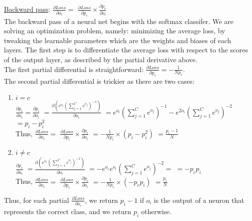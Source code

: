 \underline{Backward pass}: $\frac{\partial Loss}{\partial o_i} = $
$\frac{\partial Loss}{\partial p_c} \times \frac{\partial p_c}{\partial o_i}$\\
The backward pass of a neural net begins with the softmax classifer.
We are solving an optimization problem, namely: minimizing the average loss,
by tweaking the learnable parameters which are the weights and biases of each layers.
The first step is to differentiate the average loss with respect to the scores of the output layer,
as described by the partial derivative above.\\
The first partial differential is straightforward: $\frac{\partial Loss}{\partial p_c} = -\frac{1}{Np_c}$.\\
The second partial differential is trickier as there are two cases:
\begin{enumerate}[topsep=-12pt]
  
 \item $i = c$\\
   $ \frac{\partial p_c}{\partial o_i} = \frac{\partial p_i}{\partial o_i} $
   $ = \frac{\partial( e^{o_i} (\sum_{j=1}^{C} e^{o_j})^{-1})} {\partial o_i} $
   $ = e^{o_i} (\sum_{j=1}^{C} e^{o_j})^{-1} - e^{2o_i} (\sum_{j=1}^{C} e^{o_j})^{-2} $
   $ = p_i - p_i^2$\\
   Thus, $\frac{\partial Loss}{\partial o_i} = $
   $ \frac{\partial Loss}{\partial p_i} \times \frac{\partial p_i}{\partial o_i} $
   $ =  -\frac{1}{Np_i} \times (p_i - p_i^2) $
   $ = \frac{p_i - 1}{N} $
   
 \item $i \neq c$\\
   $ \frac{\partial p_c}{\partial o_i} $
   $ = \frac{\partial( e^{o_c} (\sum_{j=1}^{C} e^{o_j})^{-1})} {\partial o_i} $
   $ = -e^{o_c}e^{o_i} (\sum_{j=1}^{C} e^{o_j})^{-2} = $
   $ = -p_cp_i $\\
   Thus, $\frac{\partial Loss}{\partial o_i} = $
   $ \frac{\partial Loss}{\partial p_c} \times \frac{\partial p_c}{\partial o_i} $
   $ =  -\frac{1}{Np_c} \times (-p_cp_i) $
   $ = \frac{p_i}{N} $ \\   
\end{enumerate}

Thus, for each partial $\frac {\partial Loss}{\partial o_i}$, we return $p_i - 1$ if $o_i$ is the output
of a neuron that represents the correct class, and we return $p_i$ otherwise.





